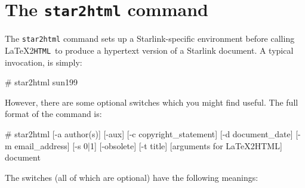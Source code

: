 \documentclass[twoside,11pt,nolof]{starlink}
\providecommand{\latextohtml}{\LaTeX2\texttt{HTML}}
\begin{document}
\appendix

\newpage
\section{The \texttt{star2html} command\label{star2html}}

The \texttt{star2html} command sets up a Starlink-specific environment before
calling \latextohtml\ to produce a hypertext version of a Starlink document.
A typical invocation, is simply:

\begin{terminalv}
# star2html sun199
\end{terminalv}

However, there are some optional switches which you might find useful.
The full format of the command is:

\begin{terminalv}
# star2html [-a author(s)] [-aux] [-c copyright_statement]
            [-d document_date] [-m email_address] [-s 0|1]
            [-obsolete] [-t title] [arguments for LaTeX2HTML] document
\end{terminalv}

The switches (all of which are optional) have the following meanings:
\end{document}
